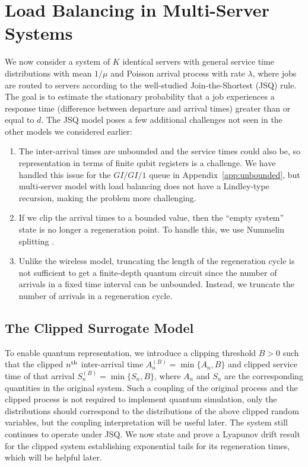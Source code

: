 \documentclass[11pt]{article}
\begin{document}
\section{Load Balancing in Multi-Server Systems}
\label{sec:load-balancing}

We now consider a system of $K$ identical servers with general service time distributions with mean $1/\mu$ and Poisson arrival process with rate $\lambda$, where jobs are routed to servers according to the well-studied Join-the-Shortest (JSQ) rule. The goal is to estimate the stationary probability that a job experiences a response time (difference between departure and arrival times) greater than or equal to $d.$
The JSQ model poses a few additional challenges not seen in the other models we considered earlier:
\begin{enumerate}
    \item The inter-arrival times are unbounded and the service times could also be, so representation in terms of finite qubit registers is a challenge. We have handled this issue for the $GI/GI/1$ queue in Appendix~\ref{app:unbounded}, but multi-server model with load balancing does not have a Lindley-type recursion, making the problem more challenging.
    \item If we clip the arrival times to a bounded value, then the ``empty system'' state  is no longer a regeneration point. To handle this, we use Nummelin splitting \cite{nummelin1978splitting,henderson2001regenerative}.
    \item Unlike the wireless model, truncating the length of the regeneration cycle is not sufficient to get a finite-depth quantum circuit since the number of arrivals in a fixed time interval can be unbounded. Instead, we truncate the number of arrivals in a regeneration cycle.
\end{enumerate}


\subsection{The Clipped Surrogate Model}

To enable quantum representation, we introduce a clipping threshold $B > 0$ such that the clipped $n^{\rm th}$ inter-arrival time $A^{(B)}_n = \min\{A_n, B\}$ and clipped service time of that arrival $S^{(B)}_n = \min\{S_n, B\}$, where $A_n$ and $S_n$ are the corresponding quantities in the original system. Such a coupling of the original process and the clipped process is not required to implement quantum simulation, only the distributions should correspond to the distributions of the above clipped random variables, but the coupling interpretation will be useful later. The system still continues to operate under JSQ. We now state and prove a Lyapunov drift result for the clipped system establishing exponential tails for its regeneration times, which will be helpful later.
\end{document}
